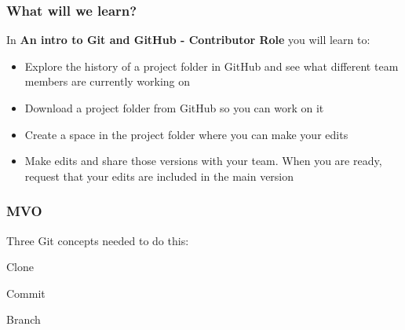 \documentclass[aspectratio=169]{beamer} %
\begin{document}
\begin{frame}
\begin{columns}[c]
	\end{columns}
\end{frame}




\begin{frame}
\frametitle{What will we learn?}

	In \textbf{An intro to Git and GitHub - Contributor Role} you will learn to:
	
	\begin{itemize}
		\item Explore the history of a project folder in GitHub and see what different team members are currently working on
		\item Download a project folder from GitHub so you can work on it
		\item Create a space in the project folder where you can make your edits
		\item Make edits and share those versions with your team. When you are ready, request that your edits are included in the main version
	\end{itemize}

\end{frame}


\begin{frame}
\frametitle{MVO}

	\hspace*{2.5cm}\Large{Three Git concepts needed to do this:}
	
	\begin{itemize}
		\setlength{\itemindent}{3cm}
		\Large{\item Clone}
		\Large{\item Commit}
		\Large{\item Branch}
	\end{itemize}

\end{frame}
\end{document}
